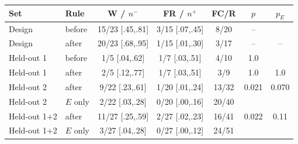 \begin{table}[t]
\vspace{3pt}
\setlength{\tabcolsep}{1.8pt}
\begin{tabular}{@{}llccccc@{}}
\toprule
Set & Rule & W / $n^{-}$ & FR / $n^{+}$ & FC/R & $p$ & $p_{E}$ \\
\midrule
Design & before & 15/23 [.45,.81] & 3/15 [.07,.45] & 8/20 & -- & \\
Design & after & 20/23 [.68,.95] & 1/15 [.01,.30] & 3/17 & -- & -- \\
Held-out 1 & before & 1/5 [.04,.62] & 1/7 [.03,.51] & 4/10 & 1.0 & \\
Held-out 1 & after & 2/5 [.12,.77] & 1/7 [.03,.51] & 3/9 & 1.0 & 1.0 \\
Held-out 2 & after & 9/22 [.23,.61] & 1/20 [.01,.24] & 13/32 & 0.021 & 0.070 \\
Held-out 2 & $E$ only & 2/22 [.03,.28] & 0/20 [.00,.16] & 20/40 & & \\
Held-out 1+2 & after & 11/27 [.25,.59] & 2/27 [.02,.23] & 16/41 & 0.022 & 0.11 \\
Held-out 1+2 & $E$ only & 3/27 [.04,.28] & 0/27 [.00,.12] & 24/51 & & \\
\bottomrule
\end{tabular}
\end{table}
